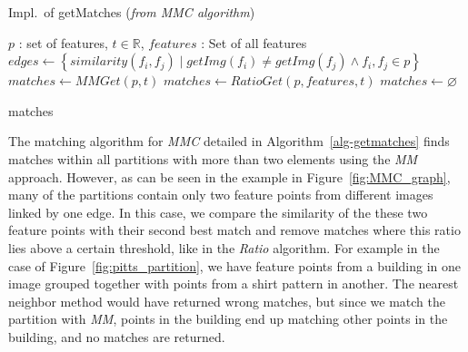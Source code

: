 \begin{algorithm}
\caption{Impl.\ of getMatches (\emph{from MMC algorithm})}
\label{alg-getmatches}
    \fontsize{10}{10}\selectfont
    \begin{algorithmic}
    \Require $p$ : set of features, $t\in \mathbb{R}$, $features$ : Set of 
    all features
    \State $edges \gets \left\{similarity(f_i, f_j) \mid getImg(f_i)
        \neq getImg(f_j) \wedge f_i, f_j \in p \right\}$
        \State $matches \gets MMGet(p, t)$
        \State $matches \gets RatioGet(p, features, t)$
    \Else
        \State $matches \gets \varnothing$
    \EndIf

    \Return matches
    \end{algorithmic}
\end{algorithm}

The matching algorithm for \emph{MMC} detailed in 
Algorithm~\ref{alg-getmatches} finds matches within all partitions with 
more than two elements using the \emph{MM} approach.  However, as can be 
seen in the example in Figure~\ref{fig:MMC_graph}, many of the 
partitions contain only two feature points from different images linked 
by one edge. In this case, we compare the similarity of the these two 
feature points with their second best match and remove matches where 
this ratio lies above a certain threshold, like in the \emph{Ratio} 
algorithm.  For example in the case of Figure~\ref{fig:pitts_partition}, 
we have feature points from a building in one image grouped together 
with points from a shirt pattern in another.  The nearest neighbor 
method would have returned wrong matches, but since we match the 
partition with \emph{MM}, points in the building end up matching other 
points in the building, and no matches are returned.
